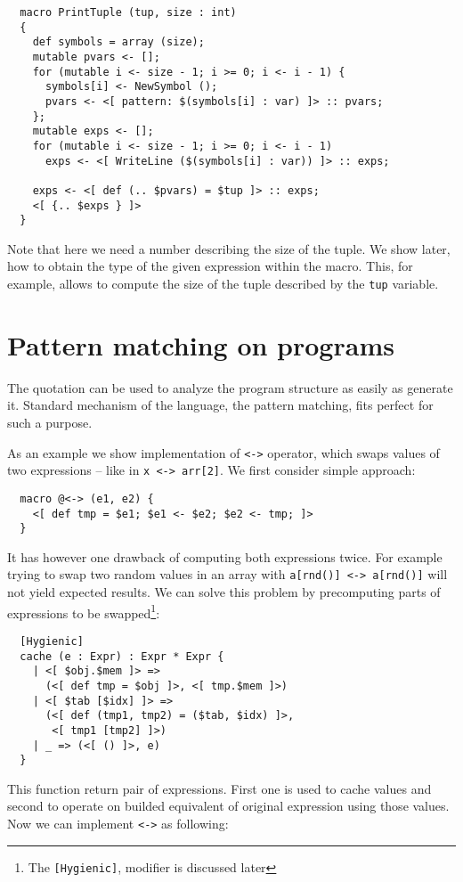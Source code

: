 \documentclass{llncs}
\begin{document}
\begin{verbatim}
  macro PrintTuple (tup, size : int)
  {
    def symbols = array (size);
    mutable pvars <- [];
    for (mutable i <- size - 1; i >= 0; i <- i - 1) {
      symbols[i] <- NewSymbol ();
      pvars <- <[ pattern: $(symbols[i] : var) ]> :: pvars;
    };
    mutable exps <- [];
    for (mutable i <- size - 1; i >= 0; i <- i - 1)
      exps <- <[ WriteLine ($(symbols[i] : var)) ]> :: exps;

    exps <- <[ def (.. $pvars) = $tup ]> :: exps;
    <[ {.. $exps } ]>
  }
\end{verbatim} %

Note that here we need a number describing the size of the tuple. We show later, 
how to obtain the type of the given expression within the macro. This, for 
example, allows to compute the size of the tuple described by the \verb,tup, variable.

\section{Pattern matching on programs}
The quotation can be used to analyze the program structure as easily as generate
it. Standard mechanism of the language, the pattern matching, fits perfect
for such a purpose. 

As an example we show implementation of \verb,<->, operator, which swaps values
of two expressions -- like in \verb,x <-> arr[2],. We first consider simple approach:

\begin{verbatim}
  macro @<-> (e1, e2) {
    <[ def tmp = $e1; $e1 <- $e2; $e2 <- tmp; ]>
  }
\end{verbatim}

It has however one drawback of computing both expressions twice. For example
trying to swap two random values in an array with \verb,a[rnd()] <-> a[rnd()],
will not yield expected results.
We can solve this problem by precomputing parts of expressions to be swapped\footnote{The 
{\tt [Hygienic]}, modifier is discussed later}:

\begin{verbatim}
  [Hygienic]
  cache (e : Expr) : Expr * Expr {
    | <[ $obj.$mem ]> =>
      (<[ def tmp = $obj ]>, <[ tmp.$mem ]>)
    | <[ $tab [$idx] ]> =>
      (<[ def (tmp1, tmp2) = ($tab, $idx) ]>, 
       <[ tmp1 [tmp2] ]>)
    | _ => (<[ () ]>, e)
  }
\end{verbatim}

This function return pair of expressions. First one is used to cache values
and second to operate on builded equivalent of original expression using those values.
Now we can implement \verb,<->, as following:
\end{document}
